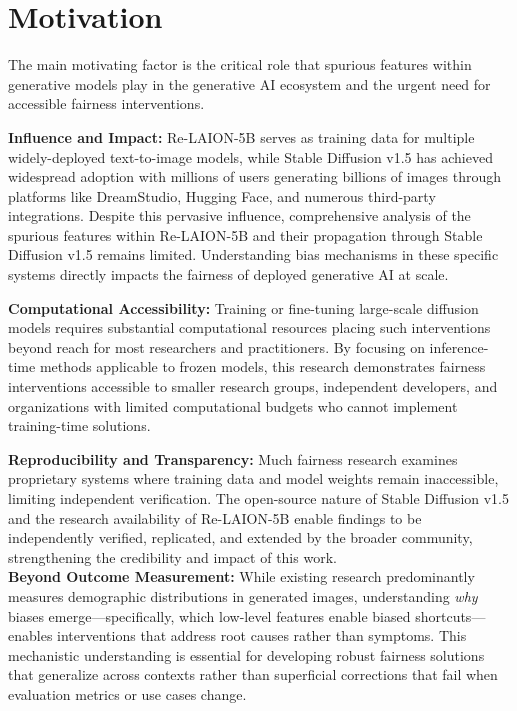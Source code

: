 \section{Motivation}

The main motivating factor is the critical role that spurious features within generative models play in the generative AI ecosystem and the urgent need for accessible fairness interventions.

\textbf{Influence and Impact:} Re-LAION-5B serves as training data for multiple widely-deployed text-to-image models, while Stable Diffusion v1.5 has achieved widespread adoption with millions of users generating billions of images through platforms like DreamStudio, Hugging Face, and numerous third-party integrations. Despite this pervasive influence, comprehensive analysis of the spurious features within Re-LAION-5B and their propagation through Stable Diffusion v1.5 remains limited. Understanding bias mechanisms in these specific systems directly impacts the fairness of deployed generative AI at scale.

\textbf{Computational Accessibility:} Training or fine-tuning large-scale diffusion models requires substantial computational resources placing such interventions beyond reach for most researchers and practitioners. By focusing on inference-time methods applicable to frozen models, this research demonstrates fairness interventions accessible to smaller research groups, independent developers, and organizations with limited computational budgets who cannot implement training-time solutions.

\textbf{Reproducibility and Transparency:} Much fairness research examines proprietary systems where training data and model weights remain inaccessible, limiting independent verification. The open-source nature of Stable Diffusion v1.5 and the research availability of Re-LAION-5B enable findings to be independently verified, replicated, and extended by the broader community, strengthening the credibility and impact of this work.\\

\textbf{Beyond Outcome Measurement:} While existing research predominantly measures demographic distributions in generated images, understanding \emph{why} biases emerge—specifically, which low-level features enable biased shortcuts—enables interventions that address root causes rather than symptoms. This mechanistic understanding is essential for developing robust fairness solutions that generalize across contexts rather than superficial corrections that fail when evaluation metrics or use cases change.


